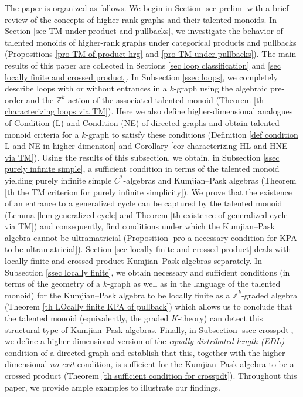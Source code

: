 \documentclass[a4paper,reqno,12pt]{amsart}
\numberwithin{equation}{section}
\theoremstyle{definition}
\theoremstyle{remark}
\begin{document}
The paper is organized as follows. We begin in Section \ref{sec prelim} with a brief review of the concepts of higher-rank graphs and their talented monoids. In Section \ref{sec TM under product and pullbacks}, we investigate the behavior of talented monoids of higher-rank graphs under categorical products and pullbacks (Propositions \ref{pro TM of product hrg} and \ref{pro TM under pullbacks}). The main results of this paper are collected in Sections \ref{sec loop classification} and \ref{sec locally finite and crossed product}. In Subsection \ref{ssec loops}, we completely describe loops with or without entrances in a $k$-graph using the algebraic pre-order and the $\mathbb{Z}^k$-action of the associated talented monoid (Theorem \ref{th characterizing loops via TM}). Here we also define higher-dimensional analogues of Condition (L) and Condition (NE) of directed graphs and obtain talented monoid criteria for a $k$-graph to satisfy these conditions (Definition \ref{def condition L and NE in higher-dimension} and Corollary \ref{cor characterizing HL and HNE via TM}). Using the results of this subsection, we obtain, in Subsection \ref{ssec purely infinite simple}, a sufficient condition in terms of the talented monoid yielding purely infinite simple $C^*$-algebras and Kumjian--Pask algebras (Theorem \ref{th the TM criterion for purely infinite simplicity}). We prove that the existence of an entrance to a generalized cycle can be captured by the talented monoid (Lemma \ref{lem generalized cycle} and Theorem \ref{th existence of generalized cycle via TM}) and consequently, find conditions under which the Kumjian--Pask algebra cannot be ultramatricial (Proposition \ref{pro a necessary condition for KPA to be ultramatricial}). Section \ref{sec locally finite and crossed product} deals with locally finite and crossed product Kumjian--Pask algebras separately. In Subsection \ref{ssec locally finite}, we obtain necessary and sufficient conditions (in terms of the geometry of a $k$-graph as well as in the language of the talented monoid) for the Kumjian--Pask algebra to be locally finite as a $\mathbb{Z}^k$-graded algebra (Theorem \ref{th LOcally finite KPA of pullback}) which allows us to conclude that the talented monoid (equivalently, the graded $K$-theory) can detect this structural type of Kumjian--Pask algebras. Finally, in Subsection \ref{ssec crosspdt}, we define a higher-dimensional version of the \emph{equally distributed length \textup{(EDL)}} condition of a directed graph and establish that this, together with the higher-dimensional \emph{no exit} condition, is sufficient for the Kumjian--Pask algebra to be a crossed product (Theorem \ref{th sufficient condition for crosspdt}). Throughout this paper, we provide ample examples to illustrate our findings.         
\end{document}
